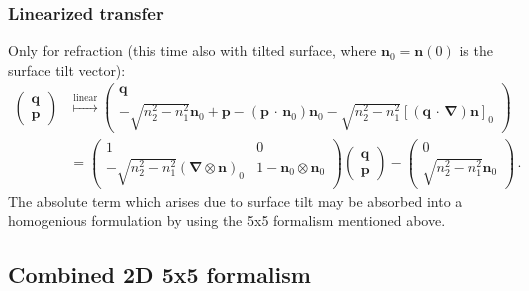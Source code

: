 \documentclass[12pt,a4paper,twoside,openright,BCOR10mm,headsepline,titlepage,abstracton,chapterprefix,final]{scrreprt}
\newcommand\Vector[1]{{\mathbf{#1}}}
\newcommand{\scpm}[2]{(#1\,\cdot\,#2)}
\begin{document}
\subsubsection{Linearized transfer}
Only for refraction (this time also with tilted surface, where $\Vector{n}_0 = \Vector{n}(0)$ is the surface tilt vector):
\begin{align}
 \begin{pmatrix}
  \Vector{q} \\
  \Vector{p}
 \end{pmatrix} &\stackrel{\text{linear}}{\mapsto}
 \begin{pmatrix}
  \Vector{q} \\
  -\sqrt{n_2^2 - n_1^2} \Vector{n}_0 + \Vector{p} - \scpm{\Vector{p}}{\Vector{n}_0} \Vector{n}_0 - \sqrt{n_2^2 - n_1^2} [\scpm{\Vector{q}}{\Vector{\nabla}} \Vector{n}]_0
 \end{pmatrix}\nonumber\\&=
 \begin{pmatrix}
  1 & 0\\
  -\sqrt{n_2^2-n_1^2} (\Vector{\nabla} \otimes \Vector{n})_0 & 1 - \Vector{n}_0 \otimes \Vector{n}_0
 \end{pmatrix}
 \begin{pmatrix}
  \Vector{q} \\
  \Vector{p}
 \end{pmatrix} -
 \begin{pmatrix}
  0 \\
  \sqrt{n_2^2-n_1^2} \Vector{n}_0
 \end{pmatrix}
\,.
\end{align}
The absolute term which arises due to surface tilt may be absorbed into a homogenious formulation by using the 5x5 formalism mentioned above.

\subsection{Combined 2D 5x5 formalism}
\end{document}
